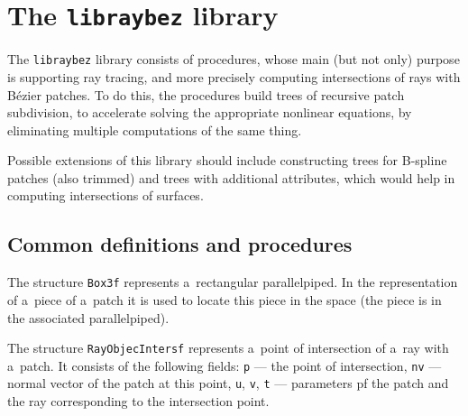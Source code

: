 

\chapter{The \texttt{libraybez} library}

The \texttt{libraybez} library consists of procedures, whose main
(but not only) purpose is supporting ray tracing, and more precisely
computing intersections of rays with B\'{e}zier patches. To do this,
the procedures build trees of recursive patch subdivision, to
accelerate solving the appropriate nonlinear equations, by eliminating
multiple computations of the same thing.

Possible extensions of this library should include constructing trees
for B-spline patches (also trimmed) and trees with additional attributes,
which would help in computing intersections of surfaces.

\section{Common definitions and procedures}

\hspace*{\parindent} The structure \texttt{Box3f} represents a~rectangular
parallelpiped. In the representation of a~piece of a~patch it is used to
locate this piece in the space (the piece is in the associated
parallelpiped).

\vspace{\bigskipamount}
The structure \texttt{RayObjecIntersf} represents a~point of intersection of
a~ray with a~patch. It consists of the following fields:
\texttt{p} --- the point of intersection, \texttt{nv} --- normal vector of the
patch at this point, \texttt{u}, \texttt{v}, \texttt{t} ---
parameters pf the patch and the ray corresponding to the intersection point.


